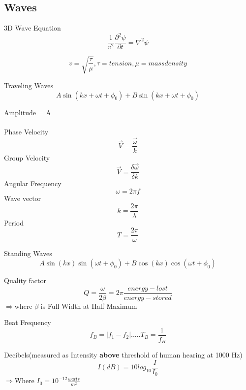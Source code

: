 \documentclass{article}
\begin{document}
\subsection{Waves}
3D Wave Equation\begin{equation}\frac{1}{v^2} \frac{\partial^2\psi}{\partial t}= \nabla^2 \psi \end{equation}

\begin{equation}v=\sqrt{\frac{\tau}{\mu}},  \tau=tension, \mu=mass density \end{equation}

Traveling Waves\begin{equation}A\sin(kx+\omega t + \phi_0)+B\sin(kx+\omega t +\phi_0)\end{equation}

Amplitude = A\\\\
Phase Velocity\begin{equation}\vec{V}=\frac{\vec{\omega}}{k}\end{equation}
Group Velocity\begin{equation}\vec{V}=\frac{\delta \vec{\omega}}{\delta k}\end{equation}
Angular Frequency\begin{equation}\omega = 2\pi f \end{equation}
Wave vector\begin{equation}k = \frac{2\pi}{\lambda}\end{equation}
Period\begin{equation} T = \frac{2\pi}{\omega}\end{equation}

Standing Waves\begin{equation}A\sin(kx)\sin(\omega t+\phi_0)+B\cos(kx)\cos(\omega t+\phi_0)\end{equation}

Quality factor\begin{equation}Q=\frac{\omega}{2\beta}=2\pi \frac{energy-lost}{energy-stored}\end{equation}
$\Rightarrow$where $\beta$ is Full Width at Half Maximum

Beat Frequency\begin{equation}f_B=|f_1-f_2|.....T_B = \frac{1}{f_B}\end{equation}

Decibels(measured as Intensity {\bf above} threshold of human hearing at 1000 Hz)\begin{equation}I(dB)=10log_{10}\frac{I}{I_0}\end{equation}
$\Rightarrow$Where $I_0 = 10^{-12} \frac{watts}{m^2}$
\end{document}
